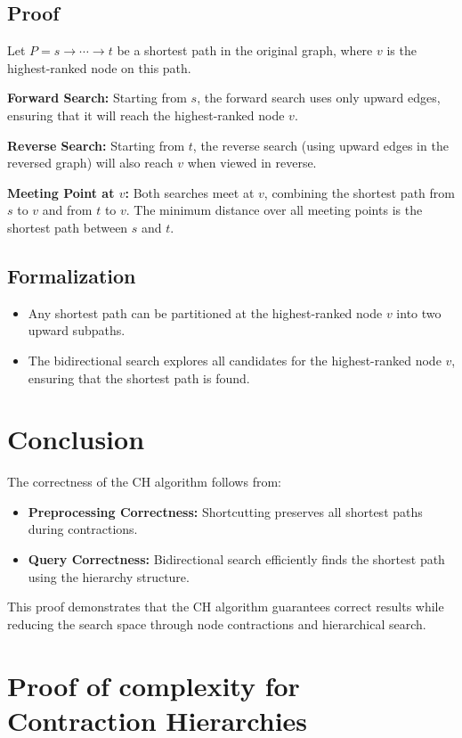 \begin{appendices}
	\subsection*{Proof}
	Let \(P = s \to \cdots \to t\) be a shortest path in the original graph, where \(v\) is the highest-ranked node on this path.
	
	\textbf{Forward Search:}  
	Starting from \(s\), the forward search uses only upward edges, ensuring that it will reach the highest-ranked node \(v\).
	
	\textbf{Reverse Search:}  
	Starting from \(t\), the reverse search (using upward edges in the reversed graph) will also reach \(v\) when viewed in reverse.
	
	\textbf{Meeting Point at \(v\):}  
	Both searches meet at \(v\), combining the shortest path from \(s\) to \(v\) and from \(t\) to \(v\). The minimum distance over all meeting points is the shortest path between \(s\) and \(t\).
	
	\subsection*{Formalization}
	\begin{itemize}
		\item Any shortest path can be partitioned at the highest-ranked node \(v\) into two upward subpaths.
		\item The bidirectional search explores all candidates for the highest-ranked node \(v\), ensuring that the shortest path is found.
	\end{itemize}
	
	\section*{Conclusion}
	The correctness of the CH algorithm follows from:
	\begin{itemize}
		\item \textbf{Preprocessing Correctness:} Shortcutting preserves all shortest paths during contractions.
		\item \textbf{Query Correctness:} Bidirectional search efficiently finds the shortest path using the hierarchy structure.
	\end{itemize}
	
	This proof demonstrates that the CH algorithm guarantees correct results while reducing the search space through node contractions and hierarchical search.


\section{Proof of complexity for Contraction Hierarchies}\label{appendix:constraction:complexity}

\end{appendices}
